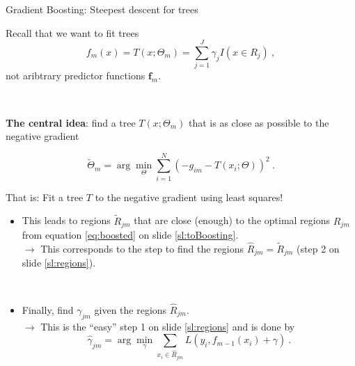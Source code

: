 \documentclass[
  10pt,
  ignorenonframetext,
]{beamer}
\providecommand{\tightlist}{%
  \setlength{\itemsep}{0pt}\setlength{\parskip}{0pt}}
\begin{document}
\begin{frame}
\begin{block}{Gradient Boosting: Steepest descent for trees}
\protect\hypertarget{gradient-boosting-steepest-descent-for-trees}{}
\(~\)

Recall that we want to fit trees
\[f_m(x)=T(x;\Theta_m)=\sum_{j=1}^J \gamma_j I(x\in R_j) \ , \] not
aribtrary predictor functions \(\mathbf{f}_m\).

\(~\)

\begin{tcolorbox}
\textbf{The central idea}: find a tree $T(x;\Theta_m)$ that is as close as possible to the negative gradient 

\begin{equation}
\tilde{\Theta}_m= \arg \min_\Theta \sum_{i=1}^N (-g_{im} -T(x_i;\Theta))^2 \ .
\end{equation}
\end{tcolorbox}

\vspace{8mm}

That is: Fit a tree \(T\) to the negative gradient using least squares!
\end{block}
\end{frame}

\begin{frame}
\vspace{2mm}

\begin{itemize}
\tightlist
\item
  This leads to regions \(\tilde{R}_{jm}\) that are close (enough) to
  the optimal regions \(R_{jm}\) from equation \eqref{eq:boosted} on
  slide \eqref{sl:toBoosting}.\\
  \vspace{2mm} \(\rightarrow\) This corresponds to the step to find the
  regions \(\hat{R}_{jm}=\tilde{R}_{jm}\) (step 2 on slide
  \ref{sl:regions}).
\end{itemize}

\(~\)

\begin{itemize}
\tightlist
\item
  Finally, find \(\gamma_{jm}\) given the regions \(\hat{R}_{jm}\).\\
  \vspace{2mm} \(\rightarrow\) This is the ``easy'' step 1 on slide
  \ref{sl:regions} and is done by \begin{equation*}
  \hat\gamma_{jm} = \arg \min_{\gamma} \sum_{x_i \in \hat{R}_{jm}} L(y_i, f_{m-1}(x_i) + \gamma) \ .
  \end{equation*}
\end{itemize}
\end{frame}
\end{document}
